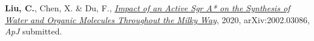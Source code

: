 


\begin{cvpubs}


\cvpub
{ %
\begin{cvitems}
\item {\textbf{Liu, C.}, Chen, X. \& Du, F., \href{https://arxiv.org/pdf/2002.03086.pdf}{\textit{Impact of an Active Sgr A* on the Synthesis of Water and Organic Molecules Throughout the Milky Way}}, 2020, arXiv:2002.03086, \textit{ApJ} submitted.}
\end{cvitems}
}


\end{cvpubs}